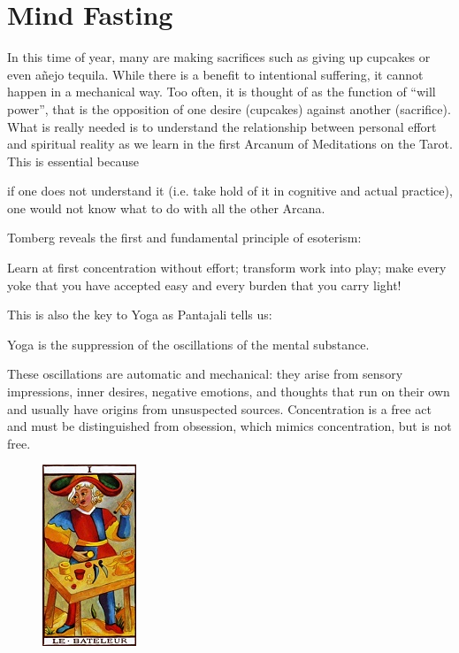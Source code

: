 \section{Mind Fasting}

In this time of year, many are making sacrifices such as giving up cupcakes or even añejo tequila. While there is a benefit to intentional suffering, it cannot happen in a mechanical way. Too often, it is thought of as the function of “will power”, that is the opposition of one desire (cupcakes) against another (sacrifice). What is really needed is to understand the relationship between personal effort and spiritual reality as we learn in the first Arcanum of Meditations on the Tarot. This is essential because 

\begin{quotex}
if one does not understand it (i.e. take hold of it in cognitive and actual practice), one would not know what to do with all the other Arcana.

\end{quotex}
Tomberg reveals the first and fundamental principle of esoterism:

\begin{quotex}
Learn at first concentration without effort; transform work into play; make every yoke that you have accepted easy and every burden that you carry light! 

\end{quotex}
This is also the key to Yoga as Pantajali tells us:

\begin{quotex}
Yoga is the suppression of the oscillations of the mental substance. 

\end{quotex}
These oscillations are automatic and mechanical: they arise from sensory impressions, inner desires, negative emotions, and thoughts that run on their own and usually have origins from unsuspected sources. Concentration is a free act and must be distinguished from obsession, which mimics concentration, but is not free.

\begin{figure}
\centering
\includegraphics[scale=6]{a20121208MindFasting-img001.jpg}
\end{figure}

